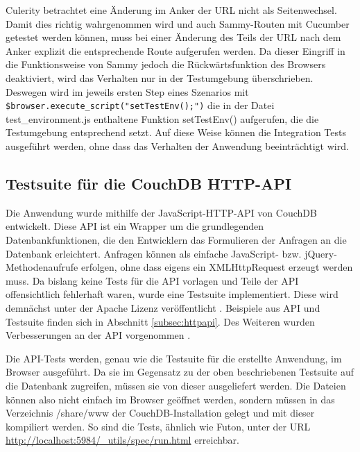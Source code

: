 Culerity betrachtet eine Änderung im Anker der URL nicht als Seitenwechsel. Damit dies richtig wahrgenommen wird und auch Sammy-Routen mit Cucumber getestet werden können, muss bei einer Änderung des Teils der URL nach dem Anker explizit die entsprechende Route aufgerufen werden. Da dieser Eingriff in die Funktionsweise von Sammy jedoch die Rückwärtsfunktion des Browsers deaktiviert, wird das Verhalten nur in der Testumgebung überschrieben. Deswegen wird im jeweils ersten Step eines Szenarios mit \lstinline!$browser.execute_script("setTestEnv();")! die in der Datei {\selectfont test\_environment.js} enthaltene Funktion {\selectfont setTestEnv()} aufgerufen, die die Testumgebung entsprechend setzt. Auf diese Weise können die Integration Tests ausgeführt werden, ohne dass das Verhalten der Anwendung beeinträchtigt wird. 






\subsection{Testsuite für die CouchDB HTTP-API}
\label{subsec:testsuite}

Die Anwendung wurde mithilfe der JavaScript-HTTP-API von CouchDB entwickelt. Diese API ist ein Wrapper um die grundlegenden Datenbankfunktionen, die den Entwicklern das Formulieren der Anfragen an die Datenbank erleichtert. Anfragen können als einfache JavaScript- bzw. jQuery-Methodenaufrufe erfolgen, ohne dass eigens ein XMLHttpRequest erzeugt werden muss. Da bislang keine Tests für die API vorlagen und Teile der API offensichtlich fehlerhaft waren, wurde eine Testsuite implementiert. Diese wird demnächst unter der Apache Lizenz veröffentlicht \cite{jira:testsuite}. Beispiele aus API und Testsuite finden sich in Abschnitt \ref{subsec:httpapi}. Des Weiteren wurden Verbesserungen an der API vorgenommen \cite{jira:bulkdelete, jira:bulksave}.

Die API-Tests werden, genau wie die Testsuite für die erstellte Anwendung, im Browser ausgeführt. Da sie im Gegensatz zu der oben beschriebenen Testsuite auf die Datenbank zugreifen, müssen sie von dieser ausgeliefert werden. Die Dateien können also nicht einfach im Browser geöffnet werden, sondern müssen in das Verzeichnis {\selectfont /share/www} der CouchDB-Installation gelegt und mit dieser kompiliert werden. So sind die Tests, ähnlich wie Futon, unter der URL \url{http://localhost:5984/\_utils/spec/run.html} erreichbar.























